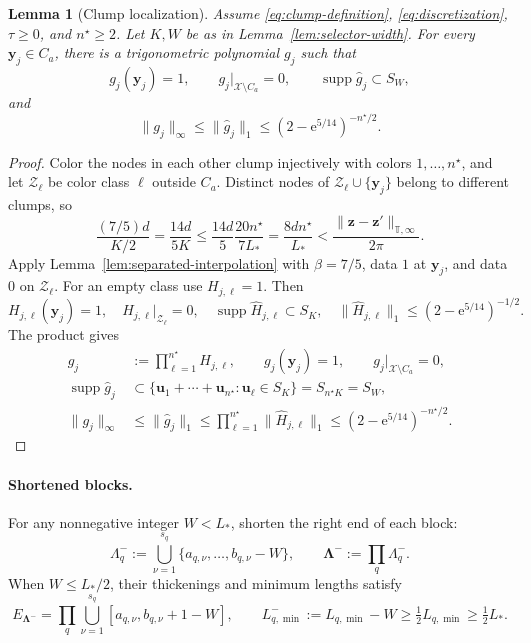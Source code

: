 \documentclass[11pt]{article}
\newtheorem{lemma}{Lemma}
\newcommand{\X}{\mathcal X}
\newcommand{\T}{\mathbb T}
\begin{document}
\begin{lemma}[Clump localization]\label{lem:anchor-localization}
Assume \eqref{eq:clump-definition}, \eqref{eq:discretization}, $\tau\ge0$, and $n^\star\ge2$. Let $K,W$ be as in Lemma~\ref{lem:selector-width}. For every $\bm y_j\in C_a$, there is a trigonometric polynomial $g_j$ such that
\begin{equation}\label{eq:anchor-properties}
g_j(\bm y_j)=1,\qquad g_j|_{\X\setminus C_a}=0,\qquad \operatorname{supp}\widehat g_j\subset S_W,
\end{equation}
and
\begin{equation}\label{eq:anchor-bound}
\|g_j\|_\infty\le\|\widehat g_j\|_1\le\left(2-\mathrm e^{5/14}\right)^{-n^\star/2}.
\end{equation}
\end{lemma}
\begin{proof}
Color the nodes in each other clump injectively with colors $1,\ldots,n^\star$, and let $\mathcal Z_\ell$ be color class $\ell$ outside $C_a$. Distinct nodes of $\mathcal Z_\ell\cup\{\bm y_j\}$ belong to different clumps, so
\[
\frac{(7/5)d}{K/2}=\frac{14d}{5K}\le\frac{14d}{5}\frac{20n^\star}{7L_*}=\frac{8dn^\star}{L_*}<\frac{\|\bm z-\bm z'\|_{\T,\infty}}{2\pi}.
\]
Apply Lemma~\ref{lem:separated-interpolation} with $\beta=7/5$, data $1$ at $\bm y_j$, and data $0$ on $\mathcal Z_\ell$. For an empty class use $H_{j,\ell}=1$. Then
\[
H_{j,\ell}(\bm y_j)=1,\quad H_{j,\ell}|_{\mathcal Z_\ell}=0,\quad \operatorname{supp}\widehat H_{j,\ell}\subset S_K,\quad \|\widehat H_{j,\ell}\|_1\le\left(2-\mathrm e^{5/14}\right)^{-1/2}.
\]
The product gives
\begin{align*}
g_j&:=\prod_{\ell=1}^{n^\star}H_{j,\ell},\qquad g_j(\bm y_j)=1,\qquad g_j|_{\X\setminus C_a}=0,\\
\operatorname{supp}\widehat g_j&\subset\{\bm u_1+\cdots+\bm u_{n^\star}:\bm u_\ell\in S_K\}=S_{n^\star K}=S_W,\\
\|g_j\|_\infty&\le\|\widehat g_j\|_1\le\prod_{\ell=1}^{n^\star}\|\widehat H_{j,\ell}\|_1\le\left(2-\mathrm e^{5/14}\right)^{-n^\star/2}.
\end{align*}
\end{proof}

\paragraph{Shortened blocks.}
For any nonnegative integer $W<L_*$, shorten the right end of each block:
\[
\Lambda_q^-:=\bigcup_{\nu=1}^{s_q}\{a_{q,\nu},\ldots,b_{q,\nu}-W\},\qquad \bm\Lambda^-:=\prod_q\Lambda_q^-.
\]
When $W\le L_*/2$, their thickenings and minimum lengths satisfy
\[
E_{\bm\Lambda^-}=\prod_q\bigcup_{\nu=1}^{s_q}[a_{q,\nu},b_{q,\nu}+1-W],\qquad L_{q,\min}^-:=L_{q,\min}-W\ge\tfrac12L_{q,\min}\ge\tfrac12L_*.
\]
\end{document}
